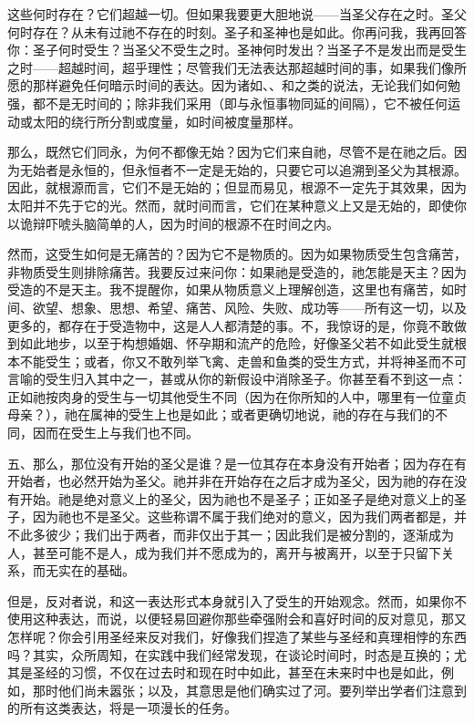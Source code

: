 这些何时存在？它们超越一切。但如果我要更大胆地说——当圣父存在之时。圣父何时存在？从未有过祂不存在的时刻。圣子和圣神也是如此。你再问我，我再回答你：圣子何时受生？当圣父不受生之时。圣神何时发出？当圣子不是发出而是受生之时——超越时间，超乎理性；尽管我们无法表达那超越时间的事，如果我们像所愿的那样避免任何暗示时间的表达。因为诸如、、和之类的说法，无论我们如何勉强，都不是无时间的；除非我们采用（即与永恒事物同延的间隔），它不被任何运动或太阳的绕行所分割或度量，如时间被度量那样。\par

那么，既然它们同永，为何不都像无始？因为它们来自祂，尽管不是在祂之后。因为无始者是永恒的，但永恒者不一定是无始的，只要它可以追溯到圣父为其根源。因此，就根源而言，它们不是无始的；但显而易见，根源不一定先于其效果，因为太阳并不先于它的光。然而，就时间而言，它们在某种意义上又是无始的，即使你以诡辩吓唬头脑简单的人，因为时间的根源不在时间之内。\par

然而，这受生如何是无痛苦的？因为它不是物质的。因为如果物质受生包含痛苦，非物质受生则排除痛苦。我要反过来问你：如果祂是受造的，祂怎能是天主？因为受造的不是天主。我不提醒你，如果从物质意义上理解创造，这里也有痛苦，如时间、欲望、想象、思想、希望、痛苦、风险、失败、成功等——所有这一切，以及更多的，都存在于受造物中，这是人人都清楚的事。不，我惊讶的是，你竟不敢做到如此地步，以至于构想婚姻、怀孕期和流产的危险，好像圣父若不如此受生就根本不能受生；或者，你又不敢列举飞禽、走兽和鱼类的受生方式，并将神圣而不可言喻的受生归入其中之一，甚或从你的新假设中消除圣子。你甚至看不到这一点：正如祂按肉身的受生与一切其他受生不同（因为在你所知的人中，哪里有一位童贞母亲？），祂在属神的受生上也是如此；或者更确切地说，祂的存在与我们的不同，因而在受生上与我们也不同。\par

五、那么，那位没有开始的圣父是谁？是一位其存在本身没有开始者；因为存在有开始者，也必然开始为圣父。祂并非在开始存在之后才成为圣父，因为祂的存在没有开始。祂是绝对意义上的圣父，因为祂也不是圣子；正如圣子是绝对意义上的圣子，因为祂也不是圣父。这些称谓不属于我们绝对的意义，因为我们两者都是，并不此多彼少；我们出于两者，而非仅出于其一；因此我们是被分割的，逐渐成为人，甚至可能不是人，成为我们并不愿成为的，离开与被离开，以至于只留下关系，而无实在的基础。\par

但是，反对者说，和这一表达形式本身就引入了受生的开始观念。然而，如果你不使用这种表达，而说，以便轻易回避你那些牵强附会和喜好时间的反对意见，那又怎样呢？你会引用圣经来反对我们，好像我们捏造了某些与圣经和真理相悖的东西吗？其实，众所周知，在实践中我们经常发现，在谈论时间时，时态是互换的；尤其是圣经的习惯，不仅在过去时和现在时中如此，甚至在未来时中也是如此，例如，那时他们尚未嚣张；以及，其意思是他们确实过了河。要列举出学者们注意到的所有这类表达，将是一项漫长的任务。\par

